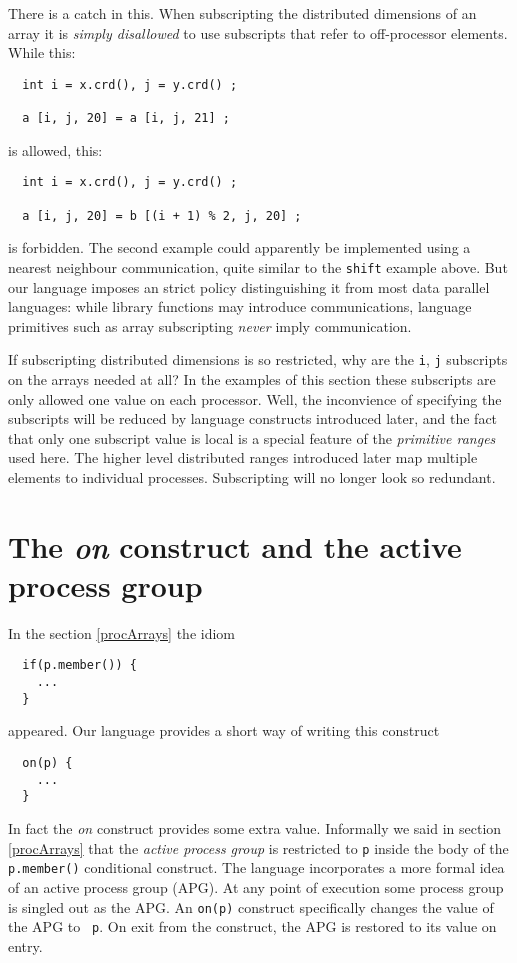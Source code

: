 There is a catch in this.
When subscripting the distributed dimensions of an array it
is {\em simply disallowed} to use subscripts that refer to
off-processor elements.  While this:
\small
\begin{verbatim}
  int i = x.crd(), j = y.crd() ;

  a [i, j, 20] = a [i, j, 21] ;
\end{verbatim}
\normalsize
is allowed, this:
\small
\begin{verbatim}
  int i = x.crd(), j = y.crd() ;

  a [i, j, 20] = b [(i + 1) % 2, j, 20] ;
\end{verbatim}
\normalsize
is forbidden.  The second example could apparently be implemented using
a nearest neighbour communication, quite similar to the {\tt shift}
example above.  But our language imposes an strict policy
distinguishing it from most data parallel languages: while
library functions may introduce communications, language
primitives such as array subscripting {\em never} imply
communication.

If subscripting distributed dimensions is so restricted, why are the
{\tt i}, {\tt j} subscripts on the arrays needed at all?  In the
examples of this section these subscripts are only allowed one value on each
processor.
Well, the inconvience of specifying the subscripts will be reduced by
language constructs introduced later, and the fact that only one subscript
value is local is a special feature of the {\em primitive ranges}
used here.  The higher level distributed ranges introduced later
map multiple elements to individual processes.  Subscripting will no
longer look so redundant.

\section{The {\em on} construct and the active process group\label{on}}

In the section \ref{procArrays} the idiom 
\small
\begin{verbatim}
  if(p.member()) {
    ...
  }
\end{verbatim}
\normalsize
appeared.  Our language provides a short way of writing
this construct
\small
\begin{verbatim}
  on(p) {
    ...
  }
\end{verbatim}
\normalsize
In fact the {\em on} construct provides some extra value.
Informally we said in section \ref{procArrays} that the {\em active
process group} is restricted to {\tt p} inside the body of the {\tt
p.member()} conditional construct.  The language
incorporates a more formal idea of an active process group (APG).  At any
point of execution some process group is singled out as the APG.  An
{\tt on(p)} construct specifically changes the value of the APG to {\tt
p}.  On exit from the construct, the APG is restored to its value on
entry.

